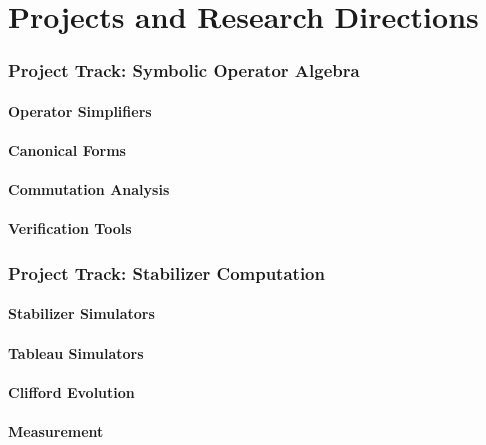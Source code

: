\documentclass[11pt,a4paper]{article}
\begin{document}
\part{Projects and Research Directions}

\section{Project Track: Symbolic Operator Algebra}

\subsection{Operator Simplifiers}

\subsection{Canonical Forms}

\subsection{Commutation Analysis}

\subsection{Verification Tools}


\section{Project Track: Stabilizer Computation}

\subsection{Stabilizer Simulators}

\subsection{Tableau Simulators}

\subsection{Clifford Evolution}

\subsection{Measurement}
\end{document}

